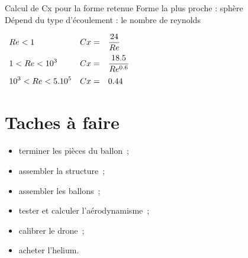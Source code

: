 \documentclass{beamer}
\begin{document}
\begin{frame}{Calcul de Cx pour la forme retenue}
 Forme la plus proche : sphère \\
 Dépend du type d'écoulement : le nombre de reynolds \\
 \begin{center}
  $\begin{array}{>{\displaystyle}l>{\displaystyle}l>{\displaystyle}l}
   Re < 1 & Cx = & \frac{24}{Re} \medbreak \\
   1 < Re < 10^3 & Cx = & \frac{18.5}{Re^{0.6}} \medbreak \\
   10^3 < Re < 5.10^5 & Cx = & 0.44
  \end{array}$
 \end{center}
\end{frame}

\section{Taches à faire}
\begin{frame}
  \begin{itemize}
    \item terminer les pièces du ballon~;
    \item assembler la structure~;
    \item assembler les ballons~;
    \item tester et calculer l'aérodynamisme~;
    \item calibrer le drone~;
    \item acheter l'helium.
  \end{itemize}
\end{frame}
\end{document}
